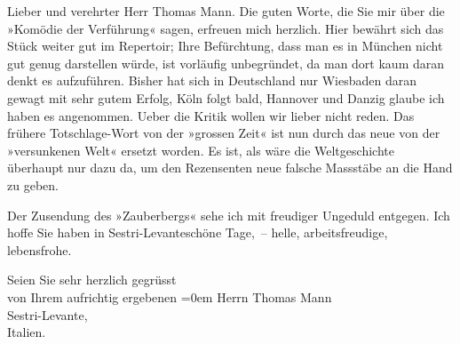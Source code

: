 \pstart{}Lieber und verehrter Herr Thomas Mann.\pend\vspace{0.5em}
\pstart
           Die guten Worte, die Sie mir über die »Komödie der
                  Verführung« sagen, erfreuen mich herzlich. Hier bewährt sich das Stück weiter
               gut im Repertoir; Ihre Befürchtung, dass man es in München nicht gut genug darstellen würde, ist vorläufig
               unbegründet, da man dort kaum daran denkt es aufzuführen. Bisher hat sich in Deutschland nur Wiesbaden daran gewagt mit sehr gutem Erfolg, Köln folgt bald, Hannover und Danzig glaube ich haben es angenommen. Ueber die
               Kritik wollen wir lieber nicht reden. Das frühere Totschlage-Wort von der »grossen
               Zeit« ist nun durch das neue von der »versunkenen Welt« ersetzt worden. Es ist, als
               wäre die Weltgeschichte überhaupt nur dazu da, um den Rezensenten neue falsche
               Massstäbe an die Hand zu geben.\pend
           
\pstart
           Der Zusendung des »Zauberbergs« sehe ich mit
               freudiger Ungeduld entgegen. Ich hoffe Sie haben in Sestri-Levanteschöne Tage, – helle, arbeitsfreudige,
               lebensfrohe.\pend
           
\pstart
           Seien Sie sehr herzlich gegrüsst{\\[\baselineskip]}von Ihrem aufrichtig ergebenen\pend
           \leftskip=0em{}
\pstart
           \noindent{}Herrn Thomas Mann{\\}Sestri-Levante,{\\}Italien.\pend
           \endnumbering{}  \newcommand{\dateiname}{L02420}\newcommand{\titel}{Arthur Schnitzler an Thomas Mann, 6. 11. 1924}\newcommand{\editorInnen}{Martin Anton Müller und Gerd-Hermann Susen}

